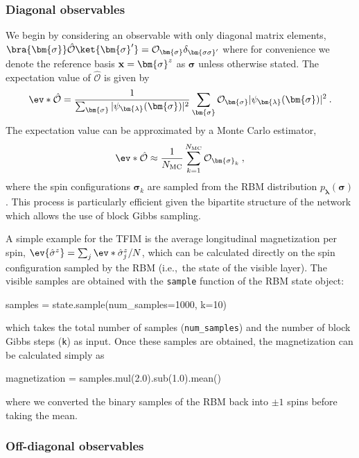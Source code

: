 \documentclass[submission, Phys, hidelnks]{SciPost}
\begin{document}
\subsubsection{Diagonal observables}
We begin by considering an observable with only diagonal matrix elements,
$\bra{ \bm{\sigma} } \hat{\mathcal{O}} \ket{ \bm{\sigma}^{\prime} }=\mathcal{O}_{\bm{\sigma}}\delta_{\bm{\sigma\sigma}^\prime}$
where for convenience we denote the reference basis ${\bf x}=\bm{\sigma}^z$ as
$\bm{\sigma}$ unless otherwise stated.
The expectation value of $\hat{\mathcal{O}}$ is given by
\begin{equation}
    \ev*{\hat{\mathcal{O}}} = \frac{1}{\sum_{\bm{\sigma}} |\psi_{\bm{\lambda}}(\bm{\sigma})|^2}
    \sum_{\bm{\sigma}} \mathcal{O}_{\bm{\sigma}}|\psi_{\bm{\lambda}}(\bm{\sigma})|^2\:.
\end{equation}
The expectation value can be approximated by a Monte Carlo estimator,
\begin{equation}
    \ev*{\hat{\mathcal{O}}} \approx \frac{1}{N_{\rm MC}} \sum_{k=1}^{N_{\rm MC}} \mathcal{O}_{\bm{\sigma}_k}\:,
\end{equation}
where the spin configurations $\bm{\sigma}_k$ are sampled from the RBM
distribution $p_{\bm{\lambda}}(\bm{\sigma})$. This process is particularly
efficient given the bipartite structure of the network which allows the use
of block Gibbs sampling.


A simple example for the TFIM is the average longitudinal magnetization per
spin, $\ev{\hat\sigma^z} = \sum_j\ev*{\hat{\sigma}^z_j}/N$,
which can be calculated directly on the spin configuration sampled by the RBM
(i.e.,~the state of the visible layer). The visible samples are obtained with
the \verb|sample| function of the RBM state object:
\begin{python}
samples = state.sample(num_samples=1000, k=10)
\end{python}
which takes the total number of samples (\verb|num_samples|) and the number
of block Gibbs steps (\verb|k|) as input. Once these samples are obtained,
the magnetization can be calculated simply as
\begin{python}
magnetization = samples.mul(2.0).sub(1.0).mean()
\end{python}
where we converted the binary samples of the RBM back into $\pm 1$ spins before
taking the mean.


\subsubsection{Off-diagonal observables}
\end{document}

